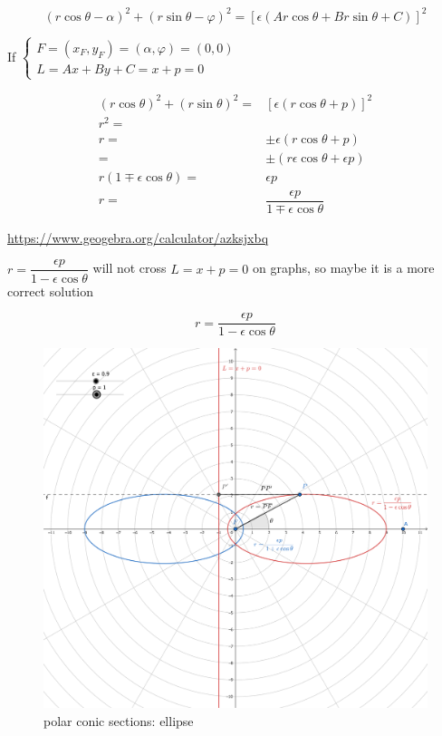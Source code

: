 \documentclass[
]{book}
\theoremstyle{definition}
\theoremstyle{definition}
\theoremstyle{definition}
\theoremstyle{definition}
\theoremstyle{remark}
\begin{document}
\[
\left(r\cos\theta-\alpha\right)^{2}+\left(r\sin\theta-\varphi\right)^{2}=\left[\epsilon\left(Ar\cos\theta+Br\sin\theta+C\right)\right]^{2}
\]

If \(\begin{cases}F=\left(x_{{\scriptscriptstyle F}},y_{{\scriptscriptstyle F}}\right)=\left(\alpha,\varphi\right)=\left(0,0\right)\\L=Ax+By+C=x+p=0\end{cases}\)

\[
\begin{aligned}
\left(r\cos\theta\right)^{2}+\left(r\sin\theta\right)^{2}= & \left[\epsilon\left(r\cos\theta+p\right)\right]^{2}\\
r^{2}=\\
r= & \pm\epsilon\left(r\cos\theta+p\right)\\
= & \pm\left(r\epsilon\cos\theta+\epsilon p\right)\\
r\left(1\mp\epsilon\cos\theta\right)= & \epsilon p\\
r= & \dfrac{\epsilon p}{1\mp\epsilon\cos\theta}
\end{aligned}
\]

\url{https://www.geogebra.org/calculator/azksjxbq}

\(r=\dfrac{\epsilon p}{1-\epsilon\cos\theta}\) will not cross \(L=x+p=0\) on graphs, so maybe it is a more correct solution

\[
r=\dfrac{\epsilon p}{1-\epsilon\cos\theta}
\]

\begin{figure}
\includegraphics[width=0.75\linewidth]{img/conic-sections-polar-ellipse} \caption{polar conic sections: ellipse}\label{fig:unnamed-chunk-7}
\end{figure}
\end{document}
